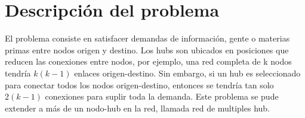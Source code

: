 \documentclass[12pt]{article}
\begin{document}
\section{Descripción del problema}
El problema consiste en satisfacer demandas de información, gente o materias primas entre nodos origen y destino. Los hubs son ubicados en posiciones que reducen las conexiones entre nodos, por ejemplo, una red completa de k nodos tendría $k(k-1)$ enlaces origen-destino. Sin embargo, si un hub es seleccionado para conectar todos los nodos origen-destino, entonces se tendría tan solo $2(k-1)$ conexiones para suplir toda la demanda. Este problema se pude extender a más de un nodo-hub en la red, llamada red de multiples hub.
\end{document}
